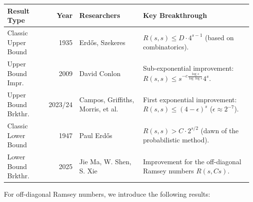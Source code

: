 \documentclass[11pt, a4paper]{ctexrep}
\begin{document}
\begin{table}[ht]
    \centering
    \renewcommand{\arraystretch}{1.2}
    \begin{tabularx}{\textwidth}{@{}>{\raggedright}p{3.2cm} r >{\raggedright}p{4.5cm} >{\raggedright\arraybackslash}X@{}}
        \toprule
        \textbf{Result Type} & \textbf{Year} & \textbf{Researchers}              & \textbf{Key Breakthrough}                                                               \\
        \midrule
        Classic Upper Bound  & 1935          & Erd\H{o}s, Szekeres               & $R(s,s) \le D \cdot 4^{s-1}$ (based on combinatorics).                                  \\
        Upper Bound Impr.    & 2009          & David Conlon                      & Sub-exponential improvement: $R(s,s) \le s^{-c \frac{\log s}{\log \log s}} 4^s$.        \\
        Upper Bound Brkthr.  & 2023/24       & Campos, Griffiths, Morris, et al. & First exponential improvement: $R(s,s) \le (4-\epsilon)^s$ ($\epsilon \approx 2^{-7}$). \\
        Classic Lower Bound  & 1947          & Paul Erd\H{o}s                    & $R(s,s) >C \cdot 2^{s/2}$ (dawn of the probabilistic method).                           \\
        Lower Bound Brkthr.  & 2025          & Jie Ma, W. Shen, S. Xie           & Improvement for the off-diagonal Ramsey numbers $R(s, Cs)$.                             \\
        \bottomrule
    \end{tabularx}
\end{table}

For off-diagonal Ramsey numbers, we introduce the following results:
\end{document}
